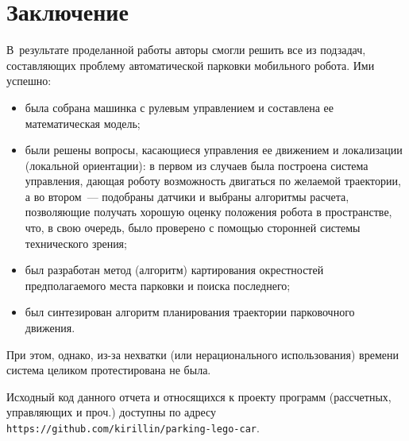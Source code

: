 \newpage
\section*{Заключение}
В~результате проделанной работы авторы смогли решить все из подзадач, составляющих проблему автоматической парковки мобильного робота.
Ими успешно:
\begin{itemize}
    \item была собрана машинка с рулевым управлением и составлена ее математическая модель;
    \item были решены вопросы, касающиеся управления ее движением и локализации (локальной ориентации): в первом из случаев была построена система управления, дающая роботу возможность двигаться по желаемой траектории, а во втором~--- подобраны датчики и выбраны алгоритмы расчета, позволяющие получать хорошую оценку положения робота в пространстве, что, в свою очередь, было проверено с помощью сторонней системы технического зрения;
    \item был разработан метод (алгоритм) картирования окрестностей предполагаемого места парковки и поиска последнего;
    \item был синтезирован алгоритм планирования траектории парковочного движения.
\end{itemize}
При этом, однако, из-за нехватки (или нерационального использования) времени система целиком протестирована не была.

Исходный код данного отчета и относящихся к проекту программ (рассчетных, управляющих и проч.) доступны по адресу \verb|https://github.com/kirillin/parking-lego-car|.